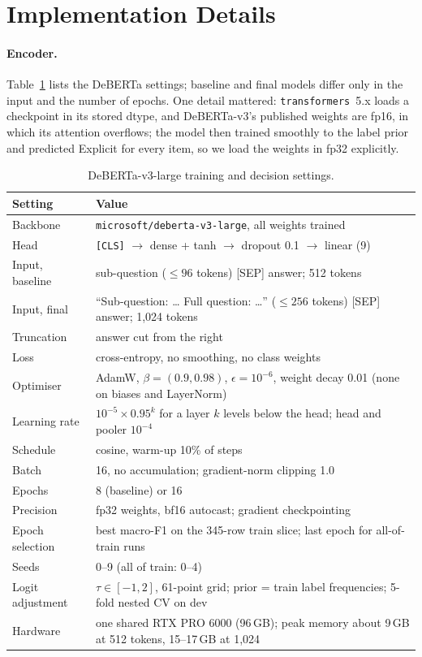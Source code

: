 \section{Implementation Details}
\label{sec:app}

\paragraph{Encoder.}
Table~\ref{tab:app-enc-hparams} lists the DeBERTa settings; baseline and final models differ only in the input and the number of epochs.
One detail mattered: \texttt{transformers}~5.x loads a checkpoint in its stored dtype, and DeBERTa-v3's published weights are fp16, in which its attention overflows; the model then trained smoothly to the label prior and predicted Explicit for every item, so we load the weights in fp32 explicitly.

\begin{table}[h]
\centering
\footnotesize
\begin{tabular}{@{}lp{}@{}}
\toprule
Setting & Value \tabularnewline
\midrule
Backbone & \raggedright \texttt{microsoft/deberta-v3-large}, all weights trained \tabularnewline
Head & \raggedright \texttt{[CLS]} $\to$ dense + tanh $\to$ dropout 0.1 $\to$ linear (9) \tabularnewline
Input, baseline & \raggedright sub-question (${\le}96$ tokens) [SEP] answer; 512 tokens \tabularnewline
Input, final & \raggedright ``Sub-question: \ldots{} Full question: \ldots'' (${\le}256$ tokens) [SEP] answer; 1,024 tokens \tabularnewline
Truncation & \raggedright answer cut from the right \tabularnewline
Loss & \raggedright cross-entropy, no smoothing, no class weights \tabularnewline
Optimiser & \raggedright AdamW, $\beta=(0.9, 0.98)$, $\epsilon=10^{-6}$, weight decay 0.01 (none on biases and LayerNorm) \tabularnewline
Learning rate & \raggedright $10^{-5}\times0.95^{k}$ for a layer $k$ levels below the head; head and pooler $10^{-4}$ \tabularnewline
Schedule & \raggedright cosine, warm-up 10\% of steps \tabularnewline
Batch & \raggedright 16, no accumulation; gradient-norm clipping 1.0 \tabularnewline
Epochs & \raggedright 8 (baseline) or 16 \tabularnewline
Precision & \raggedright fp32 weights, bf16 autocast; gradient checkpointing \tabularnewline
Epoch selection & \raggedright best macro-F1 on the 345-row train slice; last epoch for all-of-train runs \tabularnewline
Seeds & \raggedright 0--9 (all of train: 0--4) \tabularnewline
Logit adjustment & \raggedright $\tau\in[-1,2]$, 61-point grid; prior = train label frequencies; 5-fold nested CV on dev \tabularnewline
Hardware & \raggedright one shared RTX PRO 6000 (96\,GB); peak memory about 9\,GB at 512 tokens, 15--17\,GB at 1,024 \tabularnewline
\bottomrule
\end{tabular}
\caption{DeBERTa-v3-large training and decision settings.}
\label{tab:app-enc-hparams}
\end{table}

